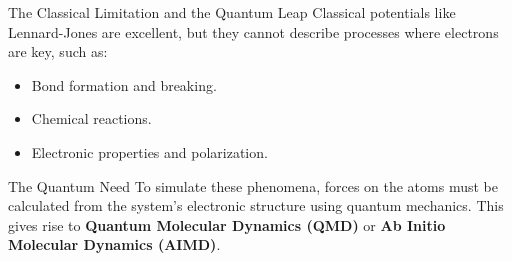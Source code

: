 \begin{frame}{The Classical Limitation and the Quantum Leap}
    Classical potentials like Lennard-Jones are excellent, but they cannot describe processes where electrons are key, such as:
    \pause
    \begin{itemize}
        \item Bond formation and breaking.
        \item Chemical reactions.
        \item Electronic properties and polarization.
    \end{itemize}
    \pause
    \bigskip
    
    \begin{block}{The Quantum Need}
        To simulate these phenomena, forces on the atoms must be calculated from the system's electronic structure using quantum mechanics. This gives rise to \textbf{Quantum Molecular Dynamics (QMD)} or \textbf{Ab Initio Molecular Dynamics (AIMD)}.
    \end{block}
\end{frame}